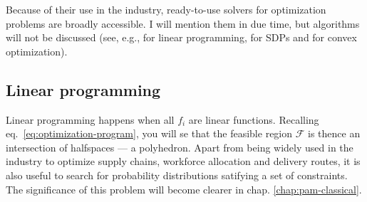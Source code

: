 		Because of their use in the industry, ready-to-use solvers for optimization problems are broadly accessible. I will mention them in due time, but algorithms will not be discussed (see, e.g., \cite{papadimitriou,gartner} for linear programming, \cite{vanderberghepaper,gartnersdp} for SDPs and \cite{boyd} for convex optimization).


		\subsection{Linear programming}
		\label{sec:linear-programming}

			Linear programming happens when all $f_i$ are linear functions. Recalling eq.~\eqref{eq:optimization-program}, you will se that the feasible region $\mathcal{F}$ is thence an intersection of halfspaces --- a polyhedron. Apart from being widely used in the industry to optimize supply chains, workforce allocation and delivery routes, it is also useful to search for probability distributions satifying a set of constraints. The significance of this problem will become clearer in chap. \ref{chap:pam-classical}.


